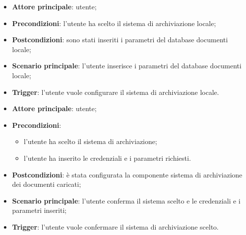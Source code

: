\documentclass[10pt, a4paper]{article}
\begin{document}
    \begin{itemize}
        \item \textbf{Attore principale}: utente;
        \item \textbf{Precondizioni}: l’utente ha scelto il sistema di archiviazione locale;
        \item \textbf{Postcondizioni}: sono stati inseriti i parametri del database documenti locale;
        \item \textbf{Scenario principale}: l’utente inserisce i parametri del database documenti locale;
        \item \textbf{Trigger}: l’utente vuole configurare il sistema di archiviazione locale.
    \end{itemize}

    \begin{itemize}
        \item \textbf{Attore principale}: utente;
        \item \textbf{Precondizioni}:
            \begin{itemize}
                \item l’utente ha scelto il sistema di archiviazione;
                \item l’utente ha inserito le credenziali e i parametri richiesti.
            \end{itemize}
        \item \textbf{Postcondizioni}: è stata configurata la componente sistema di archiviazione dei documenti caricati;
        \item \textbf{Scenario principale}: l’utente conferma il sistema scelto e le credenziali e i parametri inseriti;
        \item \textbf{Trigger}: l’utente vuole confermare il sistema di archiviazione scelto.
    \end{itemize}
\end{document}
